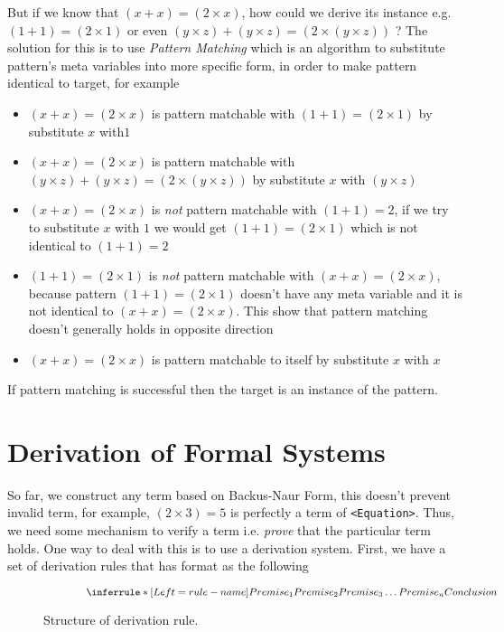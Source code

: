 \documentclass[master.tex]{subfiles}
\begin{document}
But if we know that $(x + x) = (2 \times x)$, how could we derive its instance
e.g. $(1 + 1) = (2 \times 1)$ or even $(y \times z) + (y \times z) = (2 \times
(y \times z))$ ? The solution for this is to use \emph{Pattern Matching} which
is an algorithm to substitute pattern's meta variables into more specific form,
in order to make pattern identical to target, for example
\begin{itemize}
\item $(x + x) = (2 \times x)$ is pattern matchable with $(1 + 1) = (2 \times 1)$ by
  substitute $x$ with$1$
\item $(x + x) = (2 \times x)$ is pattern matchable with $(y \times z) + (y
  \times z) = (2 \times (y \times z))$ by substitute $x$ with $(y \times z)$
\item $(x + x) = (2 \times x)$ is \emph{not} pattern matchable with $(1 + 1) = 2$, if
  we try to substitute $x$ with $1$ we would get $(1 + 1) = (2 \times 1)$ which is not
  identical to $(1 + 1) = 2$
\item $(1 + 1) = (2 \times 1)$ is \emph{not} pattern matchable with $(x + x) =
  (2 \times x)$, because pattern $(1 + 1) = (2 \times 1)$ doesn't have any meta
  variable and it is not identical to $(x + x) = (2 \times x)$. This show that
  pattern matching doesn't generally holds in opposite direction
\item $(x + x) = (2 \times x)$ is pattern matchable to itself by substitute $x$ with $x$
\end{itemize}

If pattern matching is successful then the target is an instance of the pattern.

\section{Derivation of Formal Systems}

So far, we construct any term based on Backus-Naur Form, this doesn't prevent
invalid term, for example, $(2 \times 3) = 5$ is perfectly a term of
\texttt{<Equation>}. Thus, we need some mechanism to verify a term i.e.
\emph{prove} that the particular term holds. One way to deal with this is to use
a derivation system. First, we have a set of derivation rules that has format as
the following

\begin{figure}[H]
\centering
$$
\qquad \qquad \derivRule{rule-name}{Conclusion}{Premise_1 \\ Premise_2 \\ Premise_3 \\ \ldots \\
  Premise_n}
$$
\caption{Structure of derivation rule.}
\end{figure}
\newpage
\end{document}
